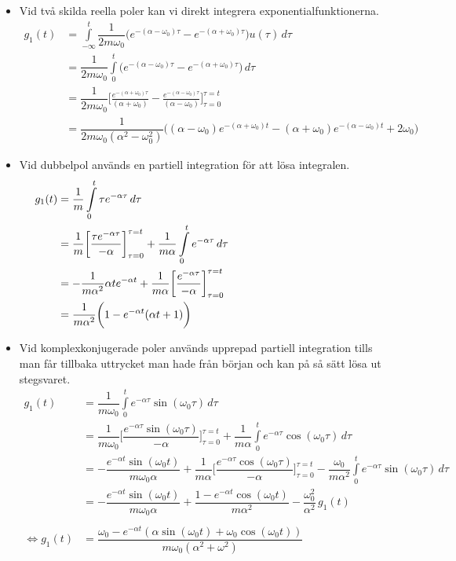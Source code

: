 \begin{itemize}
    \item Vid två skilda reella poler kan vi direkt integrera exponentialfunktionerna.
    $$\begin{aligned}
    g_1(t)
    &=\int\limits_{-\infty}^{t}\dfrac{1}{2m\omega_0}\bigg(e^{-(\alpha-\omega_0)\tau}-e^{-(\alpha+\omega_0)\tau}\bigg)u(\tau)\,d\tau
    \\&=\dfrac{1}{2m\omega_0}\int\limits_{0}^{t}\bigg(e^{-(\alpha-\omega_0)\tau}-e^{-(\alpha+\omega_0)\tau}\bigg)\,d\tau
    \\&=\dfrac{1}{2m\omega_0}\bigg[\frac{e^{-(\alpha+\omega_0)\tau}}{(\alpha+\omega_0)}-\frac{e^{-(\alpha-\omega_0)\tau}}{(\alpha-\omega_0)} \bigg]_{\tau=0}^{\tau=t}
    \\&=\dfrac{1}{2m\omega_0(\alpha^2-\omega_0^2)}\bigg((\alpha-\omega_0)e^{-(\alpha+\omega_0)t}-(\alpha+\omega_0)e^{-(\alpha-\omega_0)t}+2\omega_0\bigg)\end{aligned}$$
    \item Vid dubbelpol används en partiell integration för att lösa integralen.
    $$\begin{aligned}g_1(t)&=\dfrac{1}{m}\int\limits_{0}^{t}\tau e^{-\alpha \tau}\,d\tau
    \\&=\dfrac{1}{m} \bigg[\dfrac{\tau e^{-\alpha \tau}}{-\alpha}\bigg]_{\tau=0}^{\tau=t}+\dfrac{1}{m\alpha}\int\limits_{0}^{t}e^{-\alpha \tau}\,d\tau
    \\&=-\dfrac{1}{m\alpha^2}\alpha te^{-\alpha t}+\dfrac{1}{m\alpha}\bigg[\dfrac{e^{-\alpha \tau}}{-\alpha}\bigg]_{\tau=0}^{\tau=t}
    \\&=\dfrac{1}{m\alpha^2}\bigg(1-e^{-\alpha t}(\alpha t+1)\bigg)\text{\hspace{6cm}\,}\end{aligned}$$
    \newpage
    \item Vid komplexkonjugerade poler används upprepad partiell integration tills man får tillbaka uttrycket man hade från början och kan på så sätt lösa ut stegsvaret.
    $$\begin{aligned}
    g_1(t)&=\dfrac{1}{m\omega_0}\int\limits_{0}^{t} e^{-\alpha \tau} \sin(\omega_0 \tau)\,d\tau
    \\&=\dfrac{1}{m\omega_0}\bigg[\dfrac{e^{-\alpha \tau}\sin(\omega_0 \tau)}{-\alpha}\bigg]_{\tau=0}^{\tau=t}+\dfrac{1}{m\alpha}\int\limits_{0}^{t} e^{-\alpha \tau} \cos(\omega_0\tau)\,d\tau
    \\&=-\dfrac{e^{-\alpha t}\sin(\omega_0 t)}{m\omega_0\alpha}+\dfrac{1}{m\alpha}\bigg[\dfrac{e^{-\alpha \tau}\cos(\omega_0 \tau)}{-\alpha}\bigg]_{\tau=0}^{\tau=t}-\dfrac{\omega_0}{m\alpha^2}\int\limits_{0}^{t}e^{-\alpha \tau} \sin(\omega_0 \tau)\,d\tau
    \\&=-\dfrac{e^{-\alpha t}\sin(\omega_0 t)}{m\omega_0\alpha}+\dfrac{1-e^{-\alpha t}\cos(\omega_0 t)}{m\alpha^2}-\dfrac{\omega_0^2}{\alpha^2}\,g_1(t)
    \\\\\Longleftrightarrow g_1(t)
    &=\dfrac{\omega_0-e^{-\alpha t}(\alpha\sin(\omega_0 t)+\omega_0\cos(\omega_0 t))}{m\omega_0(\alpha^2+\omega^2)}\end{aligned}$$
\end{itemize}
